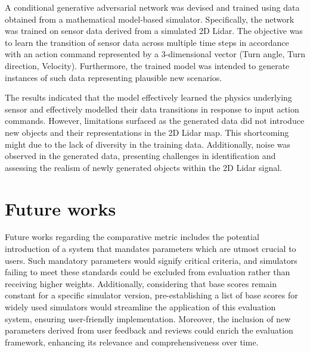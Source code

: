 \documentclass[12pt,twoside,a4paper,parskip]{scrbook} %
\begin{document}
A conditional generative adversarial network was devised and trained using data obtained from a mathematical model-based simulator. Specifically, the network was trained on sensor data derived from a simulated 2D Lidar. The objective was to learn the transition of sensor data across multiple time steps in accordance with an action command represented by a 3-dimensional vector (Turn angle, Turn direction, Velocity). Furthermore, the trained model was intended to generate instances of such data representing plausible new scenarios.

The results indicated that the model effectively learned the physics underlying sensor and effectively modelled their data transitions in response to input action commands. However, limitations surfaced as the generated data did not introduce new objects and their representations in the 2D Lidar map. This shortcoming might due to the lack of diversity in the training data. Additionally, noise was observed in the generated data, presenting challenges in identification and assessing the realism of newly generated objects within the 2D Lidar signal.


\chapter{Future works}
Future works regarding the comparative metric includes the potential introduction of a system that mandates parameters which are utmost crucial to users. Such mandatory parameters would signify critical criteria, and simulators failing to meet these standards could be excluded from evaluation rather than receiving higher weights. Additionally, considering that base scores remain constant for a specific simulator version, pre-establishing a list of base scores for widely used simulators would streamline the application of this evaluation system, ensuring user-friendly implementation. Moreover, the inclusion of new parameters derived from user feedback and reviews could enrich the evaluation framework, enhancing its relevance and comprehensiveness over time.
\end{document}
